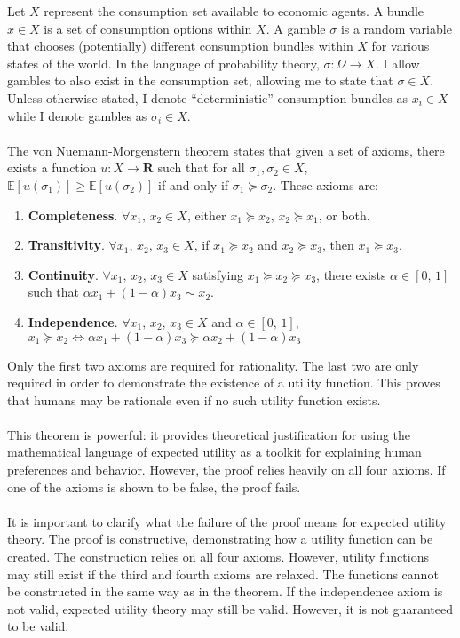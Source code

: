 \documentclass{article}
\begin{document}
Let \(X\) represent the consumption set available to economic agents.  A bundle \(x \in X\) is a set of consumption options within \(X\).  A gamble \(\sigma\) is a random variable that chooses (potentially) different consumption bundles within \(X\) for various states of the world.  In the language of probability theory, \(\sigma: \Omega \to X\).  I allow gambles to also exist in the consumption set, allowing me to state that \(\sigma \in X\).  Unless otherwise stated, I denote ``deterministic'' consumption bundles as \(x_i \in X\) while I denote gambles as \(\sigma_i \in X\).     
\\
\\
The von Nuemann-Morgenstern theorem states that given a set of axioms, there exists a function \(u: X \to \mathbf{R}\) such that for all \(\sigma_1, \sigma_2 \in X\), \(\mathbb{E}\left[u(\sigma_1)\right] \geq \mathbb{E}\left[u(\sigma_2)\right]\) if and only if \(\sigma_1 \succeq  \sigma_2\).  These axioms are:

\begin{enumerate}
	\item \textbf{Completeness}.  \(\forall x_1, \, x_2 \in X\), either \(x_1 \succeq  x_2\), \(x_2 \succeq  x_1\), or both.
	\item \textbf{Transitivity}.  \(\forall x_1, \, x_2,\, x_3 \in X\), if \(x_1 \succeq  x_2\) and \(x_2 \succeq  x_3\), then \(x_1 \succeq  x_3\).
	\item \textbf{Continuity}.  \(\forall x_1, \, x_2,\,x_3 \in X\) satisfying \(x_1 \succeq  x_2 \succeq  x_3\), there exists \(\alpha \in [0,\,1]\) such that \(\alpha x_1+(1-\alpha) x_3 \sim x_2\).
	\item \textbf{Independence}.  \(\forall x_1, \, x_2,\,x_3 \in X\) and \(\alpha \in [0,\,1]\), \(x_1 \succeq  x_2 \Leftrightarrow \alpha x_1+(1-\alpha)x_3 \succeq  \alpha x_2 +(1-\alpha)x_3\)
\end{enumerate}

Only the first two axioms are required for rationality.  The last two are only required in order to demonstrate the existence of a utility function.  This proves that humans may be rationale even if no such utility function exists.  
\\
\\
This theorem is powerful: it provides theoretical justification for using the mathematical language of expected utility as a toolkit for explaining human preferences and behavior.  However, the proof relies heavily on all four axioms.  If one of the axioms is shown to be false, the proof fails.  
\\
\\
It is important to clarify what the failure of the proof means for expected utility theory. The proof is constructive, demonstrating how a utility function can be created.  The construction relies on all four axioms.  However, utility functions may still exist if the third and fourth axioms are relaxed.  The functions cannot be constructed in the same way as in the theorem.  If the independence axiom is not valid, expected utility theory may still be valid.  However, it is not guaranteed to be valid.  
 
\end{document}
